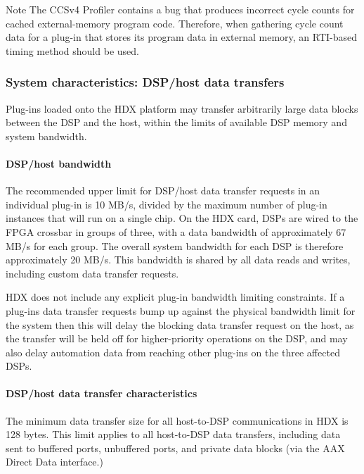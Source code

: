 \begin{DoxyNote}{Note}
The C\+C\+Sv4 Profiler contains a bug that produces incorrect cycle counts for cached external-\/memory program code. Therefore, when gathering cycle count data for a plug-\/in that stores its program data in external memory, an R\+T\+I-\/based timing method should be used.
\end{DoxyNote}
\hypertarget{a00832_subsection__system_characteristics_dsphost_data_transfers}{}\subsubsection{System characteristics\+: D\+S\+P/host data transfers}\label{a00832_subsection__system_characteristics_dsphost_data_transfers}
 Plug-\/ins loaded onto the H\+DX platform may transfer arbitrarily large data blocks between the D\+SP and the host, within the limits of available D\+SP memory and system bandwidth.

\hypertarget{a00832_subsubsection__dsphost_bandwidth_}{}\paragraph{D\+S\+P/host bandwidth}\label{a00832_subsubsection__dsphost_bandwidth_}
 The recommended upper limit for D\+S\+P/host data transfer requests in an individual plug-\/in is 10 M\+B/s, divided by the maximum number of plug-\/in instances that will run on a single chip. On the H\+DX card, D\+S\+Ps are wired to the F\+P\+GA crossbar in groups of three, with a data bandwidth of approximately 67 M\+B/s for each group. The overall system bandwidth for each D\+SP is therefore approximately 20 M\+B/s. This bandwidth is shared by all data reads and writes, including custom data transfer requests.

H\+DX does not include any explicit plug-\/in bandwidth limiting constraints. If a plug-\/in\textquotesingle{}s data transfer requests bump up against the physical bandwidth limit for the system then this will delay the blocking data transfer request on the host, as the transfer will be held off for higher-\/priority operations on the D\+SP, and may also delay automation data from reaching other plug-\/ins on the three affected D\+S\+Ps.

\hypertarget{a00832_subsubsection__dsphost_data_transfer_characteristics_}{}\paragraph{D\+S\+P/host data transfer characteristics}\label{a00832_subsubsection__dsphost_data_transfer_characteristics_}
 The minimum data transfer size for all host-\/to-\/\+D\+SP communications in H\+DX is 128 bytes. This limit applies to all host-\/to-\/\+D\+SP data transfers, including data sent to buffered ports, unbuffered ports, and private data blocks (via the A\+AX Direct Data interface.)

